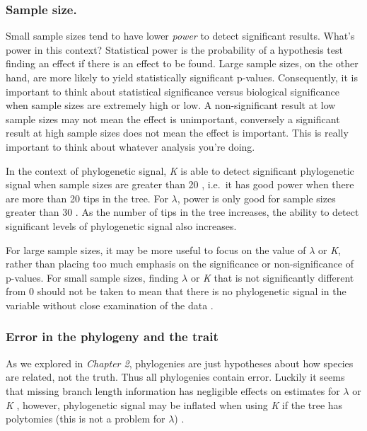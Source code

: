 \documentclass[]{book}
\begin{document}
\subsubsection{Sample size.}\label{sample-size.}

Small sample sizes tend to have lower \emph{power} to detect significant
results. What's power in this context? Statistical power is the
probability of a hypothesis test finding an effect if there is an effect
to be found. Large sample sizes, on the other hand, are more likely to
yield statistically significant p-values. Consequently, it is important
to think about statistical significance versus biological significance
when sample sizes are extremely high or low. A non-significant result at
low sample sizes may not mean the effect is unimportant, conversely a
significant result at high sample sizes does not mean the effect is
important. This is really important to think about whatever analysis
you're doing.

In the context of phylogenetic signal, \emph{K} is able to detect
significant phylogenetic signal when sample sizes are greater than 20
\citep{blomberg2003testing}, i.e.~it has good power when there are more
than 20 tips in the tree. For \(\lambda\), power is only good for sample
sizes greater than 30 \citep{freckleton2002phylogenetic}. As the number
of tips in the tree increases, the ability to detect significant levels
of phylogenetic signal also increases.

For large sample sizes, it may be more useful to focus on the value of
\(\lambda\) or \emph{K}, rather than placing too much emphasis on the
significance or non-significance of p-values. For small sample sizes,
finding \(\lambda\) or \emph{K} that is not significantly different from
0 should not be taken to mean that there is no phylogenetic signal in
the variable without close examination of the data
\citep{kamilar2013phylogenetic}.

\subsubsection{Error in the phylogeny and the
trait}\label{error-in-the-phylogeny-and-the-trait}

As we explored in \emph{Chapter 2}, phylogenies are just hypotheses
about how species are related, not the truth. Thus all phylogenies
contain error. Luckily it seems that missing branch length information
has negligible effects on estimates for \(\lambda\) or \emph{K}
\citep{munkemuller2012measure}, however, phylogenetic signal may be
inflated when using \emph{K} if the tree has polytomies (this is not a
problem for \(\lambda\)) \citep{molina2017revisiting}.
\end{document}
